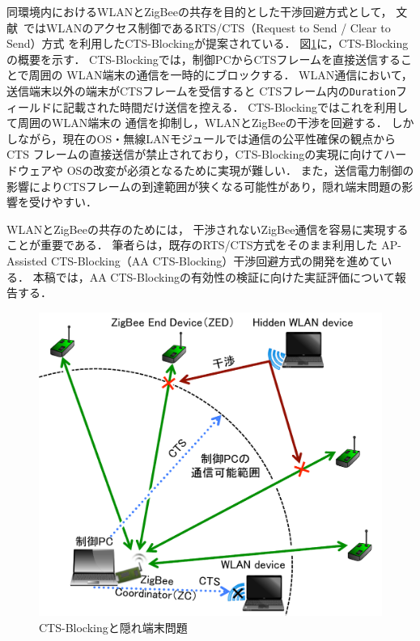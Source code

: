 \documentclass[technicalreport]{ieicej}
\begin{document}
同環境内におけるWLANとZigBeeの共存を目的とした干渉回避方式として，
文献~\cite{Hou09:}ではWLANのアクセス制御であるRTS/CTS（Request to Send / Clear to Send）方式
を利用したCTS-Blockingが提案されている．
図\ref{fig:cts_blocking}に，CTS-Blockingの概要を示す．
CTS-Blockingでは，制御PCからCTSフレームを直接送信することで周囲の
WLAN端末の通信を一時的にブロックする．
WLAN通信において，送信端末以外の端末がCTSフレームを受信すると
CTSフレーム内の\texttt{Duration}フィールドに記載された時間だけ送信を控える．
CTS-Blockingではこれを利用して周囲のWLAN端末の
通信を抑制し，WLANとZigBeeの干渉を回避する．
しかしながら，現在のOS・無線LANモジュールでは通信の公平性確保の観点からCTS
フレームの直接送信が禁止されており，CTS-Blockingの実現に向けてハードウェアや
OSの改変が必須となるために実現が難しい．
また，送信電力制御の影響によりCTSフレームの到達範囲が狭くなる可能性があり，隠れ端末問題の影響を受けやすい．

WLANとZigBeeの共存のためには，%
干渉されないZigBee通信を容易に実現することが重要である．
筆者らは，既存のRTS/CTS方式をそのまま利用した
AP-Assisted CTS-Blocking（AA CTS-Blocking）干渉回避方式の開発を進めている．
本稿では，AA CTS-Blockingの有効性の検証に向けた実証評価について報告する．

\begin{figure}[bt]
 \centering
 \includegraphics[width=\columnwidth]{figure/cts_blocking.pdf}
 \caption{CTS-Blockingと隠れ端末問題}
 \label{fig:cts_blocking}
\end{figure}
\end{document}
